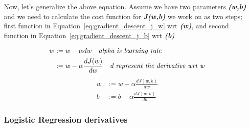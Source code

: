 Now, let's generalize the above equation. Assume we have two parameters \textbf{\textit{(w,b)}} and we need to calculate the cost function for \textbf{\textit{J(w,b)}} we work on as two steps; first function in Equation~\eqref{eq:gradient_descent_j_w} wrt \textbf{\textit{(w)}}, and second function in Equation~\eqref{eq:gradient_descent_j_b} wrt \textbf{\textit{(b)}}%
%
\begin{figure}[!t]
\subfigure[Derivative Example of function $f(x) = x^2$]{~\label{Fig:Derivative_Example}
}
\subfigure[Derivative Example of function $f(x) = x^2$ where $\alpha_1$ > $\alpha_2$]{\label{Fig:Alpha_Change}
}
\end{figure}%
%
\begin{equation}\label{eq:gredient_descent_w}
 \begin{split}
  w & := w - \alpha dw \quad \text{\textit{alpha is learning rate}}\\
   & := w - \alpha \frac{dJ(w)}{dw} \quad \text{\textit{d represent the derivative wrt w}}
 \end{split}
\end{equation}
%
\begin{subequations}
   \begin{align}
w& := w - \alpha \frac{dJ(w,b)}{dw} \label{eq:gradient_descent_j_w}\\
b& := b - \alpha \frac{dJ(w,b)}{db} \label{eq:gradient_descent_j_b}
   \end{align}
 \end{subequations}
%
\subsubsection{Logistic Regression derivatives}\label{Sec:Logistic_Bp_Derivatives}

